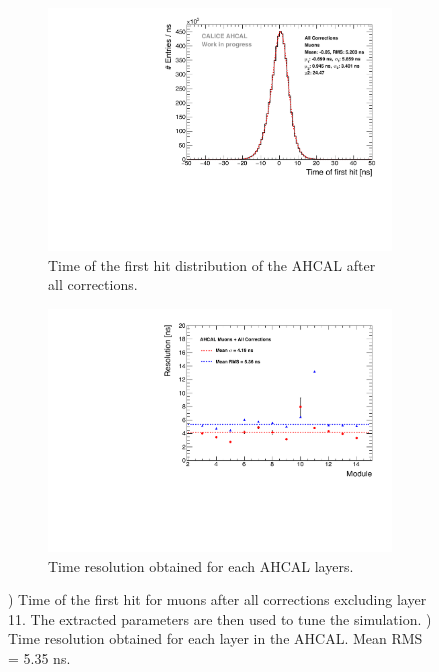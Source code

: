 \begin{figure}[htbp!]
	\begin{subfigure}[t]{0.5\textwidth}
		\centering
		\includegraphics[width=1\textwidth]{chap5/fig_AHCAL_timing/Muons/Timing_AllLayers.pdf}
		\caption{Time of the first hit distribution of the AHCAL after all corrections.}\label{fig:timing_muons}
	\end{subfigure}
	\hfill
	\begin{subfigure}[t]{0.5\textwidth}
		\centering
		\includegraphics[width=1\textwidth]{chap5/fig_AHCAL_timing/Muons/ResolutionPerModule_AllCorrection.pdf}
		\caption{Time resolution obtained for each AHCAL layers.}\label{fig:timing_reso_all_muons}
	\end{subfigure}
	\caption{) Time of the first hit for muons after all corrections excluding layer 11. The extracted parameters are then used to tune the simulation. ) Time resolution obtained for each layer in the AHCAL. Mean RMS = 5.35 ns.}
\end{figure}

